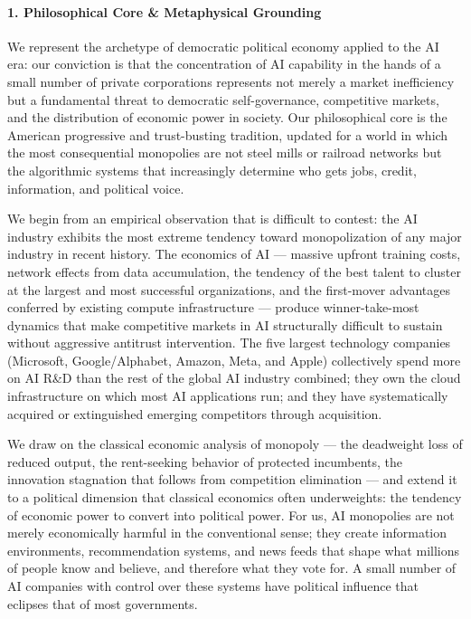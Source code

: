\paragraph{1. Philosophical Core \& Metaphysical
Grounding}\label{philosophical-core-metaphysical-grounding-28}

We represent the archetype of democratic political economy applied to
the AI era: our conviction is that the concentration of AI capability in
the hands of a small number of private corporations represents not
merely a market inefficiency but a fundamental threat to democratic
self-governance, competitive markets, and the distribution of economic
power in society. Our philosophical core is the American progressive and
trust-busting tradition, updated for a world in which the most
consequential monopolies are not steel mills or railroad networks but
the algorithmic systems that increasingly determine who gets jobs,
credit, information, and political voice.

We begin from an empirical observation that is difficult to contest: the
AI industry exhibits the most extreme tendency toward monopolization of
any major industry in recent history. The economics of AI --- massive
upfront training costs, network effects from data accumulation, the
tendency of the best talent to cluster at the largest and most
successful organizations, and the first-mover advantages conferred by
existing compute infrastructure --- produce winner-take-most dynamics
that make competitive markets in AI structurally difficult to sustain
without aggressive antitrust intervention. The five largest technology
companies (Microsoft, Google/Alphabet, Amazon, Meta, and Apple)
collectively spend more on AI R\&D than the rest of the global AI
industry combined; they own the cloud infrastructure on which most AI
applications run; and they have systematically acquired or extinguished
emerging competitors through acquisition.

We draw on the classical economic analysis of monopoly --- the
deadweight loss of reduced output, the rent-seeking behavior of
protected incumbents, the innovation stagnation that follows from
competition elimination --- and extend it to a political dimension that
classical economics often underweights: the tendency of economic power
to convert into political power. For us, AI monopolies are not merely
economically harmful in the conventional sense; they create information
environments, recommendation systems, and news feeds that shape what
millions of people know and believe, and therefore what they vote for. A
small number of AI companies with control over these systems have
political influence that eclipses that of most governments.

